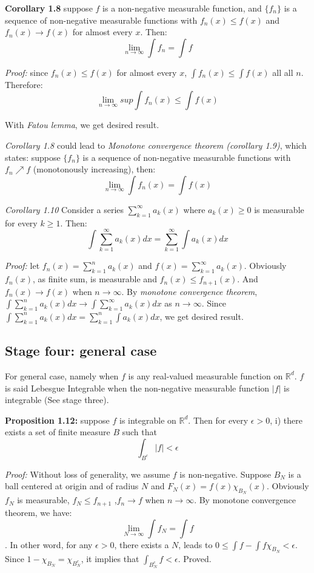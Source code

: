 \documentclass[
]{article}
\begin{document}
\textbf{Corollary 1.8} suppose \(f\) is a non-negative measurable function, and \(\{f_n\}\) is a sequence
of non-negative measurable functions with \(f_n(x)\leq f(x)\) and \(f_n(x)\to f(x)\) for almost every \(x\). Then:
\[\lim_{n\to\infty}\int f_n = \int f\]

\textit{Proof:} since \(f_n(x)\leq f(x)\) for almost every \(x\), \(\int f_n(x)\leq \int f(x)\) all all \(n\). Therefore:
\[\lim_{n\to\infty}sup\int f_n(x)\leq\int f(x)\]

With \textit{Fatou lemma}, we get desired result.

\textit{Corollary 1.8} could lead to \textit{Monotone convergence theorem (corollary 1.9)}, which states: suppose
\(\{f_n\}\) is a sequence of non-negative measurable functions with \(f_n\nearrow f \) (monotonously increasing), then:
\[\lim_{n\to\infty}\int f_n(x)=\int f(x)\]

\textit{Corollary 1.10} Consider a series \(\sum_{k=1}^{\infty}a_k(x)\) where \(a_k(x) \geq 0\) is measurable for every \(k \geq 1\). Then:
\[\int \sum_{k=1}^{\infty}a_k(x)dx=\sum_{k=1}^{\infty}\int a_k(x)dx\]

\textit{Proof:} let \(f_n(x)=\sum_{k=1}^{n}a_k(x)\) and \(f(x)=\sum_{k=1}^{\infty}a_k(x)\). Obviously \(f_n(x)\), as finite sum, is measurable
and \(f_n(x)\leq f_{n+1}(x)\). And \(f_n(x)\to f(x)\) when  \(n\to\infty\). By \textit{monotone convergence theorem},
\(\int \sum_{k=1}^na_k(x)dx\to \int \sum_{k=1}^{\infty}a_k(x)dx\) as \(n\to\infty\). Since \(\int \sum_{k=1}^na_k(x)dx=\sum_{k=1}^n\int a_k(x)dx\),
we get desired result.

\subsection{Stage four: general case}
For general case, namely when \(f\) is any real-valued measurable function on \(\mathbb{R}^d\).
\(f\) is said Lebesgue Integrable when the non-negative measurable function \(|f|\) is integrable
(See stage three).

\textbf{Proposition 1.12:} suppose \(f\) is integrable on \(\mathbb{R}^d\). Then for every \(\epsilon > 0\),
i) there exists a set of finite measure \(B\) such that
\[\int_{B^c}|f|<\epsilon\]

\textit{Proof:}
Without loss of generality, we assume \(f\) is non-negative. Suppose \(B_N\) is a ball centered at origin and of radius 
\(N\) and \(F_N(x) = f(x)\chi_{B_N}(x)\). Obviously \(f_N\) is measurable, \(f_N \leq f_{n+1}\)
,\(f_n \to f\) when \(n \to \infty\). By monotone convergence theorem, we have:
\[\lim_{N\to\infty}\int f_N=\int f\]. In other word, for any \(\epsilon > 0\), there exists a \(N\),
leads to \(0 \leq \int f - \int f\chi_{B_N} < \epsilon\). Since \(1-\chi_{B_N}=\chi_{B_N^c}\), it implies
that \(\int_{B_N^c}f < \epsilon\). Proved.
\end{document}
